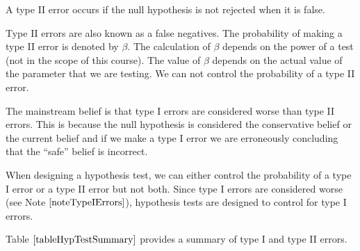 \begin{definition}	
A type II error occurs if the null hypothesis is not rejected when it is false.
\end{definition}

Type II errors are also known as a false negatives. The probability of making a type II error is denoted by $\beta$. The calculation of $\beta $ depends on the power of a test (not in the scope of this course). The value of $\beta$ depends on the actual value of the parameter that we are testing. We can not control the probability of a type II error.

\begin{nt}\label{noteTypeIErrors}
The mainstream belief is that type I errors are considered worse than type II errors. This is because the null hypothesis is considered the conservative belief or the current belief and if we make a type I error we are erroneously concluding that the ``safe'' belief is incorrect.
\end{nt}

\begin{nt}
When designing a hypothesis test, we can either control the probability of a type I error or a type II error but not both. Since type I errors are considered worse (see Note $\ref{noteTypeIErrors}$), 
hypothesis tests are designed to control for type I errors.
\end{nt}

Table $\ref{tableHypTestSummary}$ provides a summary of type I and type II errors.


